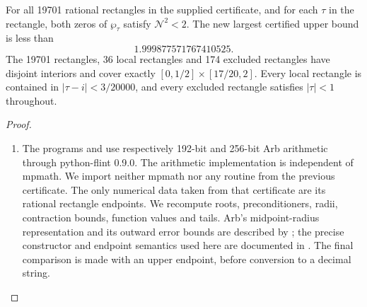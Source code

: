 \begin{theorem}\label{push:src:E.4.1}


For all 19701 rational rectangles in the supplied certificate, and for
each $\tau$ in the rectangle, both zeros of $\wp_\tau$ satisfy
$\mathcal N^2<2$. The new largest certified upper bound is less than
\[
 1.999877571767410525.
\]
The 19701 rectangles, 36 local rectangles and 174 excluded rectangles
have disjoint interiors and cover exactly
$[0,1/2]\times[17/20,2]$. Every local rectangle is contained in
$|\tau-i|<3/20000$, and every excluded rectangle satisfies
$|\tau|<1$ throughout.
\end{theorem}



\begin{proof}
\begin{enumerate}[label=\arabic*.,leftmargin=*]
\item The programs  and
 use respectively 192-bit and 256-bit
Arb arithmetic through python-flint 0.9.0. The arithmetic implementation
is independent of mpmath. We import neither mpmath nor any routine
from the previous certificate. The only numerical data taken from that
certificate are its rational rectangle endpoints. We recompute roots,
preconditioners, radii, contraction bounds, function values and tails.
Arb's midpoint-radius representation and its outward error bounds are
described by \citet[Section~2, pp.~2--4, and Section~3, pp.~4--6]{Johansson2016}; the precise
constructor and endpoint semantics used here are documented in
\citet{PythonFlint2026}. The final comparison is made with an upper
endpoint, before conversion to a decimal string.


\end{enumerate}
\end{proof}
